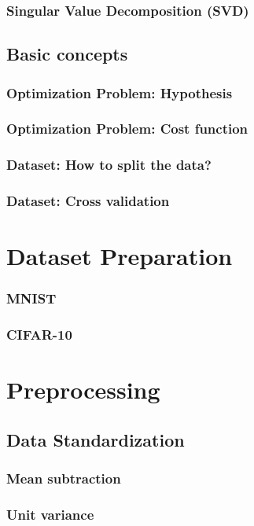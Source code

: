 \documentclass{beamer}
\begin{document}
\begin{frame}
    \frametitle{Singular Value Decomposition (SVD)}
\end{frame}

\subsection{Basic concepts}

\begin{frame}
    \frametitle{Optimization Problem: Hypothesis}
\end{frame}

\begin{frame}
    \frametitle{Optimization Problem: Cost function}
\end{frame}

\begin{frame}
    \frametitle{Dataset: How to split the data?}
\end{frame}

\begin{frame}
    \frametitle{Dataset: Cross validation}
\end{frame}

\section{Dataset Preparation}

\begin{frame}
    \frametitle{MNIST}
\end{frame}

\begin{frame}
    \frametitle{CIFAR-10}
\end{frame}

\section{Preprocessing}

\subsection{Data Standardization}

\begin{frame}
    \frametitle{Mean subtraction}
\end{frame}

\begin{frame}
    \frametitle{Unit variance}
\end{frame}
\end{document}
